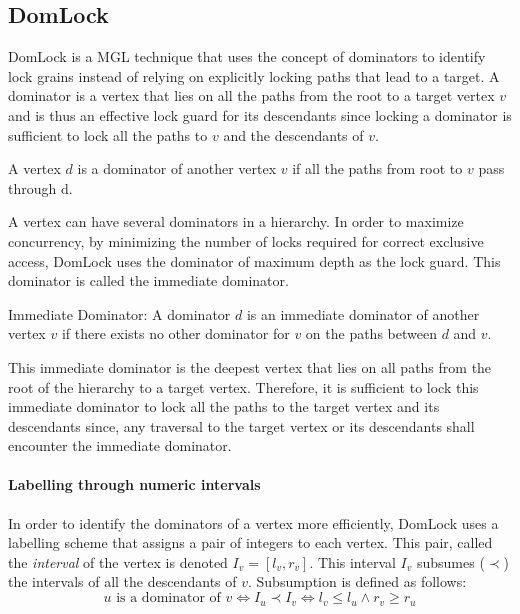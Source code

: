 \subsection{DomLock}
DomLock \cite{kalikar2016domlock} is a MGL technique that uses the concept of dominators to identify lock grains instead of relying on explicitly locking paths that lead to a target. A dominator is a vertex that lies on all the paths from the root to a target vertex $v$ and is thus an effective lock guard for its descendants since locking a dominator is sufficient to lock all the paths to $v$ and the descendants of $v$. 

\begin{definition}[Dominator]
    A vertex $d$ is a dominator of another vertex $v$ if all the paths from root to $v$ pass through d.
\end{definition}

A vertex can have several dominators in a hierarchy. 
In order to maximize concurrency, by minimizing the number of locks required for correct exclusive access, DomLock uses the dominator of maximum depth as the lock guard. This dominator is called the immediate dominator. 




\begin{definition}
    Immediate Dominator: A dominator $d$ is an immediate dominator of another vertex $v$ if there exists no other dominator for $v$ on the paths between $d$ and $v$.
\end{definition}

This immediate dominator is the deepest vertex that lies on all paths from the root of the hierarchy to a target vertex. Therefore, it is sufficient to lock this immediate dominator to lock all the paths to the target vertex and its descendants since, any traversal to the target vertex or its descendants shall encounter the immediate dominator.

\paragraph{Labelling through numeric intervals}
In order to identify the dominators of a vertex more efficiently, DomLock uses a labelling scheme that assigns a pair of integers to each vertex. This pair, called the \emph{interval} of the vertex is denoted  $I_v = [l_v, r_v]$. 
This interval $I_v$ subsumes ($\prec$) the intervals of all the descendants of $v$. Subsumption is defined as follows:
\begin{equation}
    u \text{ is a dominator of } v \iff I_u \prec I_v \iff l_v \leq l_u \land r_v \geq r_u
\end{equation}

